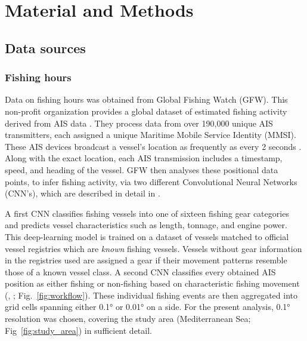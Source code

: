 \chapter{Material and Methods}

\section{Data sources}
\subsection{Fishing hours}
Data on fishing hours was obtained from Global Fishing Watch (GFW). This non-profit organization provides a global dataset of estimated fishing activity
derived from AIS data \citep{gfw_dataset}. 
They process data from over 190,000 unique AIS transmitters, each assigned a unique Maritime Mobile Service Identity (MMSI).
These AIS devices broadcast a vessel's location as frequently as every 2 seconds \citep{kontasvesselupdate, taconet2019global}. Along with the exact location,
each AIS transmission includes a timestamp, speed, and heading of the vessel. GFW then analyses these positional data points, to infer fishing activity, via two 
different Convolutional Neural Networks (CNN's), which are described in detail in \cite{Kroodsma18}. 

\bigskip

A first CNN classifies fishing vessels into one of sixteen fishing gear categories  and 
predicts vessel characteristics such as length, tonnage, and engine power. This deep-learning model is trained on
a dataset of vessels matched to official vessel registries which are \textit{known} fishing vessels. Vessels without
gear information in the registries used are assigned a gear if their movement patterns resemble those of a known
vessel class. A second CNN classifies every obtained AIS position as either fishing or non-fishing based on characteristic fishing movement (\citeauthor{Kroodsma18}, \citeyear{Kroodsma18}; Fig.~\ref{fig:workflow}). 
These individual fishing events are then aggregated into grid cells spanning either 0.1° or 0.01° on a side. For the present analysis, 0.1° resolution was chosen,
covering the study area (Mediterranean Sea; Fig~\ref{fig:study_area}) in sufficient detail.

\bigskip

